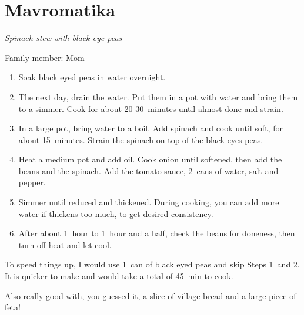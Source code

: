 \chapter{Mavromatika}
\label{ch:mavromatika}


\textit{Spinach stew with black eye peas}

Family member: Mom

\begin{enumerate}
    \item Soak black eyed peas in water overnight.
    \item The next day, drain the water. Put them in a pot with water and bring them to a simmer. Cook for about 20-30~minutes until almost done and strain.
    \item In a large pot, bring water to a boil. Add spinach and cook until soft, for about 15~minutes. Strain the spinach on top of the black eyes peas.
    \item Heat a medium pot and add oil. Cook onion until softened, then add the beans and the spinach. Add the tomato sauce, 2~cans of water, salt and pepper.
    \item Simmer until reduced and thickened. During cooking, you can add more water if thickens too much, to get desired consistency.
    \item After about 1~hour to 1~hour and a half, check the beans for doneness, then turn off heat and let cool.
\end{enumerate}

To speed things up, I would use 1~can of black eyed peas and skip Steps 1~and 2. It is quicker to make and would take a total of 45~min to cook.

Also really good with, you guessed it, a slice of village bread and a large piece of feta!
